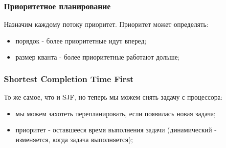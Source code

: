 \begin{frame}
\frametitle{Приоритетное планирование}

Назначим каждому потоку приоритет. Приоритет может определять:
\begin{itemize}
  \item порядок - более приоритетные идут вперед;
  \item размер кванта - более приоритетные работают дольше;
\end{itemize}

\end{frame}

\begin{frame}
\frametitle{Shortest Completion Time First}

То же самое, что и SJF, но теперь мы можем снять задачу с процессора:
\begin{itemize}
  \item мы можем захотеть перепланировать, если появилась новая задача;
  \item приоритет - оставшееся время выполнения задачи (динамический - изменяется, когда задача выполняется);
\end{itemize}
\end{frame}

